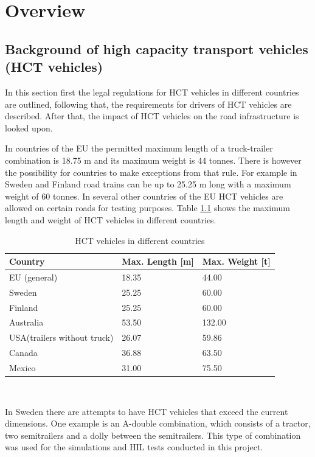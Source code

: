 \documentclass[ExampleMasters.tex]{subfiles}
\begin{document}
\clearpage
{\pagestyle{empty}\cleardoublepage}%
\chapter{Overview}
\label{chap:overview}


\section{Background of high capacity transport vehicles (HCT vehicles)}
\label{sec:legal_situation}
In this section first the legal regulations for \gls{HCT} vehicles in different countries are outlined, following that, the requirements for drivers of \gls{HCT} vehicles are described. After that, the impact of \gls{HCT} vehicles on the road infrastructure is looked upon.

In countries of the EU the permitted maximum length of a truck-trailer combination is 18.75 m and its maximum weight is 44 tonnes. There is however the possibility for countries to make exceptions from that rule.\cite{96/53/EC}  For example in Sweden and Finland road trains can be up to 25.25 m long with a  maximum weight of 60 tonnes.\cite{Vaegverket}
In several other countries of the EU \gls{HCT} vehicles are allowed on certain roads for testing purposes. 
Table \ref{tab:HCT_vehicles_in_different_countries} shows the maximum length and weight of \gls{HCT} vehicles in different countries.

\begin{table}[!htb]
	\centering
	\caption{\gls{HCT} vehicles in different countries\cite{Vaegverket}\cite{HCT_vehicles_Australia}\Cite{HCT_vehicles_USA}\cite{HCT_vehicles_Canada}\Cite{HCT_vehicles_Mexico}}
	\label{tab:HCT_vehicles_in_different_countries}
	\begin{tabular}{l|l|l|}
		Country   & Max. Length [m] & Max. Weight [t] \\ \hline
		EU (general) & 18.35 & 44.00\\
		Sweden    &       25.25      &       60.00      \\
		Finland   &            25.25 &         60.00    \\
		Australia &      53.50       &           132.00  \\
		USA(trailers without truck)&      26.07       &    59.86        \\
		Canada & 36.88 & 63.50 \\
		Mexico & 31.00 & 75.50 \\
	\end{tabular} \\
\end{table}
In Sweden there are attempts to have \gls{HCT} vehicles that exceed the current dimensions. One example is an A-double combination, which consists of a tractor, two semitrailers and a dolly between the semitrailers. This type of combination was used for the simulations and \gls{HIL} tests conducted in this project.\\
\end{document}
